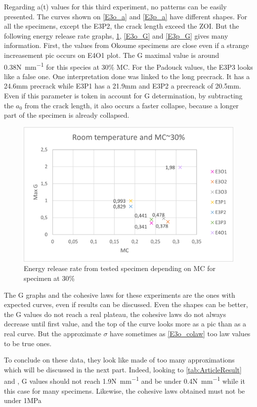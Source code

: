 Regarding a(t) values for this third experiment, no patterns can be easily presented. The curves shown on \ref{E3o_a} and \ref{E3p_a} have different shapes. For all the specimens, except the E3P2, the crack length exceed the ZOI. But the following energy release rate graphs, \ref{fig:Res_MC30}, \ref{E3o_G} and \ref{E3p_G} gives many information. 
First, the values from Okoume specimens are close even if a strange increasement pic occurs on E4O1 plot. The G maximal value is around 0.38\si{\newton\per\milli\meter} for this species at 30\% MC. For the Padouck values, the E3P3 looks like a false one. One interpretation done was linked to the long precrack. It has a 24.6\si{\milli\meter} precrack while E3P1 has a 21.9\si{\milli\meter} and E3P2 a precreack of 20.5\si{\milli\meter}. Even if this parameter is token in account for G determination, by subtracting the $a_{0}$ from the crack length, it also occurs a faster collapse, because a longer part of the specimen is already collapsed.
\begin{figure}[th]
	\centering
	\includegraphics[width=\textwidth]{Figures/Res_MC30}
	\caption[G depending on MC for specimen at 30\%]{Energy release rate from tested specimen depending on MC for specimen at 30\%}
	\label{fig:Res_MC30}
\end{figure}
The G graphs and the cohesive laws for these experiments are the ones with expected curves, even if results can be discussed. Even the shapes can be better, the G values do not reach a real plateau, the cohesive laws do not always decrease until first value, and the top of the curve looks more as a pic than as a real curve. But the approximate $\sigma$ have sometimes as \ref{E3o_colaw} too law values to be true ones. 

To conclude on these data, they look like made of too many approximations which will be discussed in the next part. Indeed, looking to \ref{tab:ArticleResult} and \parencite{Reference7}, G values should not reach 1.9\si{\newton\per\milli\meter} and be under 0.4\si{\newton\per\milli\meter} while it this case for many specimens. Likewise, the cohesive laws obtained must not be under 1\si{\mega\pascal}


